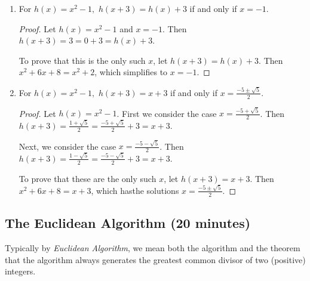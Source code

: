 \documentclass{ximera}
\begin{document}
\begin{example}
\begin{enumerate}
		\begin{solution}
			
			\begin{enumerate}
				\item For $h(x)=x^2-1,$ $h(x+3)=h(x)+3$ if and only if $x=-1$.
				\begin{proof}
					Let $h(x)=x^2-1$ and $x=-1$. Then $h(x+3)=3=0+3=h(x)+3$.

					To prove that this is the only such $x$, let $h(x+3)=h(x)+3$. Then $x^2+6x+8=x^2+2$, which simplifies to $x=-1$.
				\end{proof}
				\item For $h(x)=x^2-1,$ $h(x+3)=x+3$ if and only if $x=\frac{-5\pm\sqrt{5}}{2}$.
				\begin{proof}
					Let $h(x)=x^2-1$. First we consider the case $x=\frac{-5+\sqrt{5}}{2}$. Then $h(x+3)=\frac{1+\sqrt{5}}{2}=
					\frac{-5+\sqrt{5}}{2}+3=x+3$. 
					
					Next, we consider the case $x=\frac{-5-\sqrt{5}}{2}$. Then $h(x+3)=\frac{1-\sqrt{5}}{2}=
					\frac{-5-\sqrt{5}}{2}+3=x+3$.

					To prove that these are the only such $x$, let $h(x+3)=x+3$. Then $x^2+6x+8=x+3$, which  hasthe solutions  $x=\frac{-5\pm\sqrt{5}}{2}$.
				\end{proof}
			\end{enumerate}
		\end{solution}
	\end{enumerate}
\end{example}

\subsection{The Euclidean Algorithm (20 minutes)}

Typically by \emph{Euclidean Algorithm}, we mean  both the algorithm and the theorem that the algorithm always generates the greatest common divisor of two (positive) integers.
\end{document}
